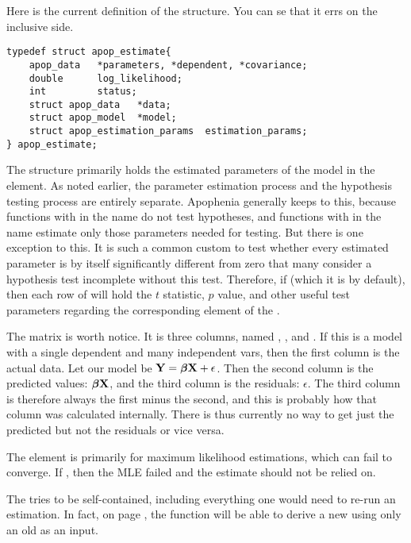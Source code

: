 Here is the current definition of the  structure. You can se that it errs on the inclusive side.
\begin{lstlisting}
typedef struct apop_estimate{
    apop_data   *parameters, *dependent, *covariance;
    double      log_likelihood;
    int         status;
    struct apop_data   *data;
    struct apop_model  *model;
    struct apop_estimation_params  estimation_params;
} apop_estimate;
\end{lstlisting}

The  structure primarily holds the estimated
parameters of the model in the 
element. As noted earlier, the parameter estimation process and the
hypothesis testing process are entirely separate. Apophenia generally
keeps to this, because functions with  in the name do not
test hypotheses, and functions with  in the name estimate
only those parameters needed for testing. But there is one exception
to this. It is such a common custom to test whether every estimated
parameter is by itself significantly different from zero that many
consider a hypothesis test incomplete without this test. Therefore, if
 (which it is by default), then 
each row of  will hold the $t$ statistic,
$p$ value, and other useful test parameters regarding the corresponding
element of the .

The  matrix is worth notice. It is three columns, named 
, , and . 
 If this is a model with a single dependent and many
independent vars, then the first column is the actual data. Let our
model be ${\bf Y} = {\mbox{\boldmath$\beta$}} {\bf X} + \epsilon$. Then the second column is the
predicted values: ${\mbox{\boldmath$\beta$}} {\bf X}$, and the third column is the residuals:
$\epsilon$. The third column is therefore always the first minus
the second, and this is probably how that column was calculated
internally. There is thus currently no way to get just the predicted
but not the residuals or vice versa.

The  element is primarily for maximum likelihood
estimations, which can fail to converge. If ,
then the MLE failed and the estimate should not be relied on.

The  tries to be self-contained, including
everything one would need to re-run an estimation. In fact, on page
\pageref{restart}, the  function will be
able to derive a new  using only an old
 as an input. 

